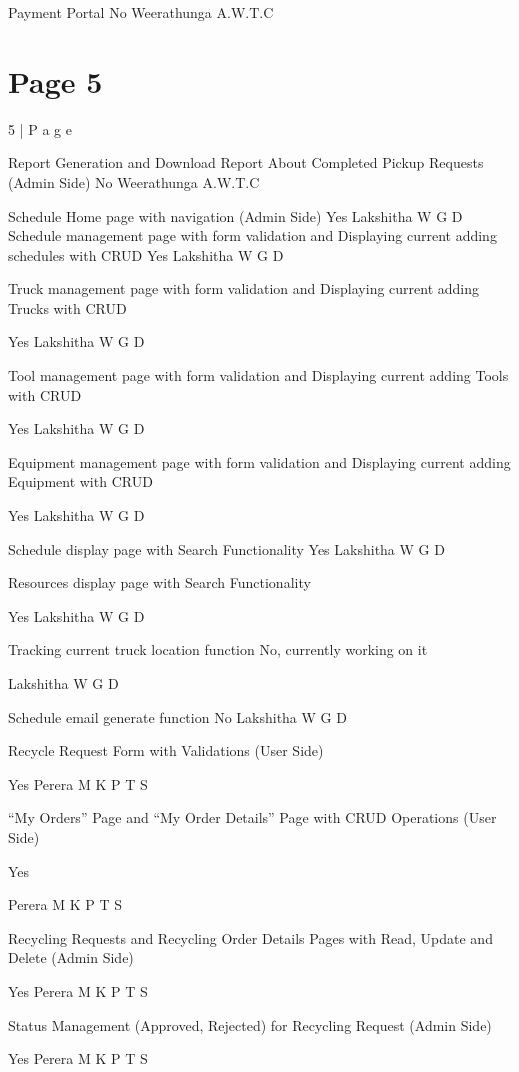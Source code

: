 \documentclass{article}
\begin{document}
Payment Portal No Weerathunga 
A.W.T.C 
 

\section*{Page 5}
5 | P a g e 
 
Report Generation and Download Report About 
Completed Pickup Requests (Admin Side) 
No Weerathunga 
A.W.T.C 
 
   
Schedule Home page with navigation (Admin Side) Yes Lakshitha W G D 
Schedule management page with form validation 
and Displaying current adding schedules with CRUD 
Yes Lakshitha W G D 
 
Truck management page with form validation and 
Displaying current adding Trucks  with CRUD  
 
Yes Lakshitha W G D 
 
Tool management page with form validation and 
Displaying current adding Tools with CRUD 
 
Yes Lakshitha W G D 
 
Equipment management page with form validation 
and Displaying current adding Equipment with 
CRUD 
 
Yes Lakshitha W G D 
 
Schedule display page with Search Functionality Yes Lakshitha W G D 
 
Resources display page with Search Functionality 
 
Yes Lakshitha W G D 
 
Tracking current truck  location function No, currently 
working on it 
 
Lakshitha W G D 
 
Schedule email generate function No Lakshitha W G D 
 
Recycle Request Form with Validations (User Side) 
 
Yes Perera M K P T S 
 
“My Orders” Page and “My Order Details” Page with 
CRUD Operations (User Side) 
 
Yes 
 
Perera M K P T S 
 
Recycling Requests and Recycling Order Details 
Pages with Read, Update and Delete (Admin Side) 
 
Yes Perera M K P T S 
 
Status Management (Approved, Rejected) for 
Recycling Request (Admin Side) 
 
Yes Perera M K P T S 
 
\end{document}
